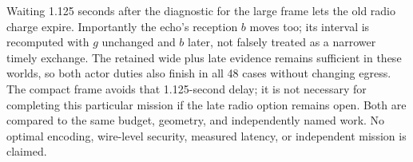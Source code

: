 \documentclass{article}
\begin{document}
Waiting 1.125 seconds after the diagnostic for the large frame lets
the old radio charge expire. Importantly the echo's reception $b$
moves too; its interval is recomputed with $g$ unchanged and $b$
later, not falsely treated as a narrower timely exchange. The
retained wide plus late evidence remains sufficient in these
worlds, so both actor duties also finish in all 48 cases without
changing egress. The compact frame avoids that 1.125-second delay;
it is not necessary for completing this particular mission if the
late radio option remains open. Both are compared to the same budget,
geometry, and independently named work. No optimal encoding,
wire-level security, measured latency, or independent mission is
claimed.
\end{document}
